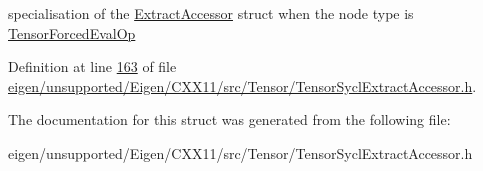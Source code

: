 specialisation of the \hyperlink{struct_eigen_1_1_tensor_sycl_1_1internal_1_1_extract_accessor}{Extract\+Accessor} struct when the node type is \hyperlink{class_eigen_1_1_tensor_forced_eval_op}{Tensor\+Forced\+Eval\+Op} 

Definition at line \hyperlink{eigen_2unsupported_2_eigen_2_c_x_x11_2src_2_tensor_2_tensor_sycl_extract_accessor_8h_source_l00163}{163} of file \hyperlink{eigen_2unsupported_2_eigen_2_c_x_x11_2src_2_tensor_2_tensor_sycl_extract_accessor_8h_source}{eigen/unsupported/\+Eigen/\+C\+X\+X11/src/\+Tensor/\+Tensor\+Sycl\+Extract\+Accessor.\+h}.



The documentation for this struct was generated from the following file\+:\begin{DoxyCompactItemize}
\item 
eigen/unsupported/\+Eigen/\+C\+X\+X11/src/\+Tensor/\+Tensor\+Sycl\+Extract\+Accessor.\+h\end{DoxyCompactItemize}
